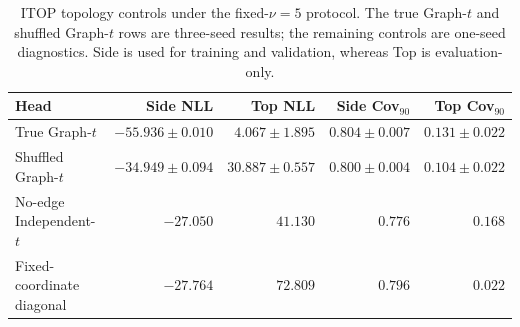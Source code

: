 \begin{table}[t]
\centering
\caption{ITOP topology controls under the fixed-$\nu=5$ protocol.  The true
Graph-$t$ and shuffled Graph-$t$ rows are three-seed results; the remaining
controls are one-seed diagnostics.  Side is used for training and validation,
whereas Top is evaluation-only.}
\label{tab:itop-reviewer-controls-evidence}
\small
\begin{tabular}{lrrrr}
\toprule
Head & Side NLL & Top NLL & Side Cov$_{90}$ & Top Cov$_{90}$ \\
\midrule
True Graph-$t$ & $-55.936\pm0.010$ & $4.067\pm1.895$ & $0.804\pm0.007$ & $0.131\pm0.022$ \\
Shuffled Graph-$t$ & $-34.949\pm0.094$ & $30.887\pm0.557$ & $0.800\pm0.004$ & $0.104\pm0.022$ \\
No-edge Independent-$t$ & $-27.050$ & $41.130$ & $0.776$ & $0.168$ \\
Fixed-coordinate diagonal & $-27.764$ & $72.809$ & $0.796$ & $0.022$ \\
\bottomrule
\end{tabular}
\end{table}
